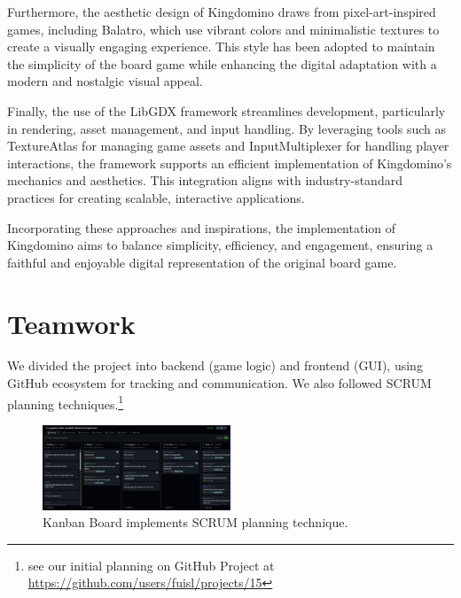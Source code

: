 \documentclass[conference]{IEEEtran}
\begin{document}
Furthermore, the aesthetic design of Kingdomino draws from pixel-art-inspired
games, including Balatro\cite{wiki:balatro}, which use vibrant colors and
minimalistic textures to create a visually engaging experience. This style has
been adopted to maintain the simplicity of the board game while enhancing the
digital adaptation with a modern and nostalgic visual appeal.

Finally, the use of the LibGDX framework\cite{libgdx} streamlines development,
particularly in rendering, asset management, and input handling. By leveraging
tools such as TextureAtlas\cite{wiki:textureatlas} for managing game assets and
InputMultiplexer for handling player interactions, the framework supports an
efficient implementation of Kingdomino's mechanics and aesthetics. This
integration aligns with industry-standard practices for creating scalable,
interactive applications.

Incorporating these approaches and inspirations, the implementation of
Kingdomino aims to balance simplicity, efficiency, and engagement, ensuring a
faithful and enjoyable digital representation of the original board game.


\section{Teamwork}
\label{sec:teamwork}

We divided the project into backend (game logic) and frontend (GUI), using
GitHub ecosystem for tracking and communication. We also followed SCRUM
planning techniques.\footnote{see our initial planning on GitHub Project at
    \url{https://github.com/users/fuisl/projects/15}}

\begin{figure}[htbp]
    \centerline{\includegraphics[width=0.5\textwidth]{assets/github-project.png}}
    \caption{Kanban Board implements SCRUM planning technique.}\label{fig:kanban}
\end{figure}
\end{document}
